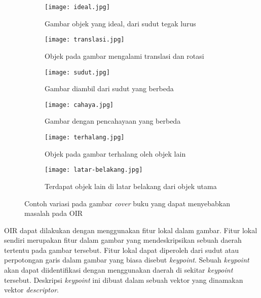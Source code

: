 \begin{figure}[H]
	\centering %
	\begin{subfigure}{0.3\textwidth}
		\texttt{[image: ideal.jpg]}
		\caption{Gambar objek yang ideal, dari sudut tegak lurus}
		\label{fig:oir_ideal}
	\end{subfigure}\hfil %
	\begin{subfigure}{0.3\textwidth}
		\texttt{[image: translasi.jpg]}
		\caption{Objek pada gambar mengalami translasi dan rotasi}
		\label{fig:oir_translasi}
	\end{subfigure}\hfil %
	\begin{subfigure}{0.3\textwidth}
		\texttt{[image: sudut.jpg]}
		\caption{Gambar diambil dari sudut yang berbeda}
		\label{fig:oir_sudut}
	\end{subfigure}\hfill
	
	\medskip
	\begin{subfigure}{0.3\textwidth}
		\texttt{[image: cahaya.jpg]}
		\caption{Gambar dengan pencahayaan yang berbeda}
		\label{fig:oir_cahaya}
	\end{subfigure}\hfil %
	\begin{subfigure}{0.3\textwidth}
		\texttt{[image: terhalang.jpg]}
		\caption{Objek pada gambar terhalang oleh objek lain}
		\label{fig:oir_terhalang}
	\end{subfigure}\hfil %
	\begin{subfigure}{0.3\textwidth}
		\texttt{[image: latar-belakang.jpg]}
		\caption{Terdapat objek lain di latar belakang dari objek utama}
		\label{fig:oir_latar-belakang}
	\end{subfigure}
	\caption{Contoh variasi pada gambar \textit{cover} buku yang dapat menyebabkan masalah pada OIR}
	\label{fig:images}
\end{figure}

OIR dapat dilakukan dengan menggunakan fitur lokal dalam gambar. Fitur lokal sendiri merupakan fitur dalam gambar yang mendeskripsikan sebuah daerah tertentu pada gambar tersebut. Fitur lokal dapat diperoleh dari sudut atau perpotongan garis dalam gambar yang biasa disebut \textit{keypoint}. Sebuah \textit{keypoint} akan dapat diidentifikasi dengan menggunakan daerah di sekitar \textit{keypoint} tersebut. Deskripsi \textit{keypoint} ini dibuat dalam sebuah vektor yang dinamakan vektor \textit{descriptor}.

